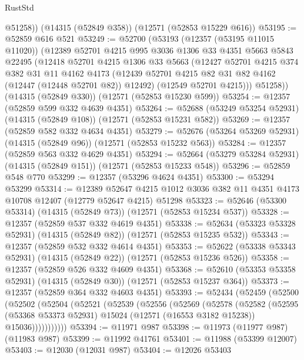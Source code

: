 \begin{lexlean}{RustStd}
\begin{coremodule}
        @51258))
    (@14315 (@52849 @358))
    (@12571 (@52853 @15229 @616))
@53195 := @52859 @616 @521
@53249 := @52700
    (@53193
      (@12357 (@53195 @11015 @11020))
      (@12389
        @52701
        @4215
        @995
        @3036
        @1306
        @33
        @4351
        @5663
        @5843
        @22495
        (@12418
          @52701
          @4215
          @1306
          @33
          @5663
          (@12427
            @52701
            @4215
            @374
            @382
            @31
            @11
            @4162
            @4173
            (@12439 @52701 @4215 @82 @31 @82 @4162 (@12447 (@12448 @52701 @82)) @12492)
            (@12549 @52701 @4215)))
        @51258))
    (@14315 (@52849 @330))
    (@12571 (@52853 @15230 @599))
@53254 := @12357 (@52859 @599 @332 @4639 @4351)
@53264 := @52688 (@53249 @53254 @52931) (@14315 (@52849 @108)) (@12571 (@52853 @15231 @582))
@53269 := @12357 (@52859 @582 @332 @4634 @4351)
@53279 := @52676 (@53264 @53269 @52931) (@14315 (@52849 @96)) (@12571 (@52853 @15232 @563))
@53284 := @12357 (@52859 @563 @332 @4629 @4351)
@53294 := @52664 (@53279 @53284 @52931) (@14315 (@52849 @151)) (@12571 (@52853 @15233 @548))
@53296 := @52859 @548 @770
@53299 := @12357 (@53296 @4624 @4351)
@53300 := @53294 @53299
@53314 := @12389
    @52647
    @4215
    @1012
    @3036
    @382
    @11
    @4351
    @4173
    @10708
    @12407
    (@12779 @52647 @4215)
    @51298
@53323 := @52646 (@53300 @53314) (@14315 (@52849 @73)) (@12571 (@52853 @15234 @537))
@53328 := @12357 (@52859 @537 @332 @4619 @4351)
@53338 := @52634 (@53323 @53328 @52931) (@14315 (@52849 @82)) (@12571 (@52853 @15235 @532))
@53343 := @12357 (@52859 @532 @332 @4614 @4351)
@53353 := @52622 (@53338 @53343 @52931) (@14315 (@52849 @22)) (@12571 (@52853 @15236 @526))
@53358 := @12357 (@52859 @526 @332 @4609 @4351)
@53368 := @52610 (@53353 @53358 @52931) (@14315 (@52849 @30)) (@12571 (@52853 @15237 @364))
@53373 := @12357 (@52859 @364 @332 @4603 @4351)
@53393 := @52434
    (@52459
      (@52500
        (@52502
          (@52504
            (@52521
              (@52539
                (@52556
                  (@52569
                    (@52578
                      (@52582
                        (@52595
                          (@53368 @53373 @52931)
                          @15024
                          (@12571 (@16553 @3182 @15238))
                          @15036)))))))))))
@53394 := @11971 @987
@53398 := @11973 (@11977 @987) (@11983 @987)
@53399 := @11992 @41761
@53401 := @11988 (@53399 @12007)
@53403 := @12030 (@12031 @987)
@53404 := @12026 @53403

\end{coremodule}
\end{lexlean}
